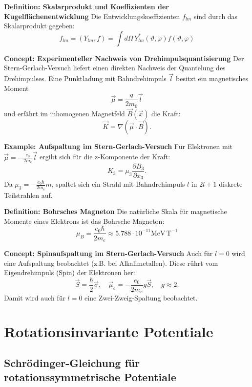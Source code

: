\documentclass[10pt, letterpaper]{article}
\begin{document}
\textbf{Definition: Skalarprodukt und Koeffizienten der Kugelflächenentwicklung}  
Die Entwicklungskoeffizienten \(f_{lm}\) sind durch das Skalarprodukt gegeben:
$$
f_{lm} = \left(Y_{lm}, f\right) = \int d\Omega \, Y_{lm}^*(\vartheta, \varphi) f(\vartheta, \varphi)
$$


\textbf{Concept: Experimenteller Nachweis von Drehimpulsquantisierung}  
Der Stern-Gerlach-Versuch liefert einen direkten Nachweis der Quantelung des Drehimpulses. Eine Punktladung mit Bahndrehimpuls \(\vec{l}\) besitzt ein magnetisches Moment
$$
\vec{\mu} = \frac{q}{2m_0} \vec{l}
$$
und erfährt im inhomogenen Magnetfeld \(\vec{B}(\vec{x})\) die Kraft:
$$
\vec{K} = \nabla (\vec{\mu} \cdot \vec{B}).
$$


\textbf{Example: Aufspaltung im Stern-Gerlach-Versuch}  
Für Elektronen mit \(\vec{\mu} = -\frac{e_0}{2m_e} \vec{l}\) ergibt sich für die z-Komponente der Kraft:
$$
K_3 = \mu_3 \frac{\partial B_3}{\partial x_3}.
$$
Da \(\mu_3 = -\frac{e_0 \hbar}{2m_e} m\), spaltet sich ein Strahl mit Bahndrehimpuls \(l\) in \(2l + 1\) diskrete Teilstrahlen auf.



\textbf{Definition: Bohrsches Magneton}  
Die natürliche Skala für magnetische Momente eines Elektrons ist das Bohrsche Magneton:
$$
\mu_B = \frac{e_0 \hbar}{2m_e} \approx 5.788 \cdot 10^{-11} \mathrm{MeV\, T^{-1}}
$$


\textbf{Concept: Spinaufspaltung im Stern-Gerlach-Versuch}  
Auch für \(l = 0\) wird eine Aufspaltung beobachtet (z.B. bei Alkalimetallen). Diese rührt vom Eigendrehimpuls (Spin) der Elektronen her:
$$
\vec{S} = \frac{\hbar}{2} \vec{\sigma}, \quad \vec{\mu}_e = -\frac{e_0}{2m_e} g \vec{S}, \quad g \approx 2.
$$
Damit wird auch für \(l = 0\) eine Zwei-Zweig-Spaltung beobachtet.





\pagebreak






\section{Rotationsinvariante Potentiale}


\subsection{Schrödinger-Gleichung für rotationssymmetrische
Potentiale}
\end{document}
